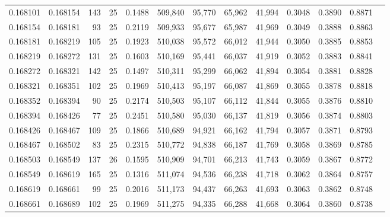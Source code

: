 \begin{tabular}{rrrrrrrrrrrrr}
0.168101 & 0.168154 &   143 &  25 &                                     0.1488 & 509,840 &  95,770 &  65,962 &  41,994 & 0.3048 & 0.3890 & 0.8871 \\
0.168154 & 0.168181 &    93 &  25 &                                     0.2119 & 509,933 &  95,677 &  65,987 &  41,969 & 0.3049 & 0.3888 & 0.8863 \\
0.168181 & 0.168219 &   105 &  25 &                                     0.1923 & 510,038 &  95,572 &  66,012 &  41,944 & 0.3050 & 0.3885 & 0.8853 \\
0.168219 & 0.168272 &   131 &  25 &                                     0.1603 & 510,169 &  95,441 &  66,037 &  41,919 & 0.3052 & 0.3883 & 0.8841 \\
0.168272 & 0.168321 &   142 &  25 &                                     0.1497 & 510,311 &  95,299 &  66,062 &  41,894 & 0.3054 & 0.3881 & 0.8828 \\
0.168321 & 0.168351 &   102 &  25 &                                     0.1969 & 510,413 &  95,197 &  66,087 &  41,869 & 0.3055 & 0.3878 & 0.8818 \\
0.168352 & 0.168394 &    90 &  25 &                                     0.2174 & 510,503 &  95,107 &  66,112 &  41,844 & 0.3055 & 0.3876 & 0.8810 \\
0.168394 & 0.168426 &    77 &  25 &                                     0.2451 & 510,580 &  95,030 &  66,137 &  41,819 & 0.3056 & 0.3874 & 0.8803 \\
0.168426 & 0.168467 &   109 &  25 &                                     0.1866 & 510,689 &  94,921 &  66,162 &  41,794 & 0.3057 & 0.3871 & 0.8793 \\
0.168467 & 0.168502 &    83 &  25 &                                     0.2315 & 510,772 &  94,838 &  66,187 &  41,769 & 0.3058 & 0.3869 & 0.8785 \\
0.168503 & 0.168549 &   137 &  26 &                                     0.1595 & 510,909 &  94,701 &  66,213 &  41,743 & 0.3059 & 0.3867 & 0.8772 \\
0.168549 & 0.168619 &   165 &  25 &                                     0.1316 & 511,074 &  94,536 &  66,238 &  41,718 & 0.3062 & 0.3864 & 0.8757 \\
0.168619 & 0.168661 &    99 &  25 &                                     0.2016 & 511,173 &  94,437 &  66,263 &  41,693 & 0.3063 & 0.3862 & 0.8748 \\
0.168661 & 0.168689 &   102 &  25 &                                     0.1969 & 511,275 &  94,335 &  66,288 &  41,668 & 0.3064 & 0.3860 & 0.8738 \\

\end{tabular}
